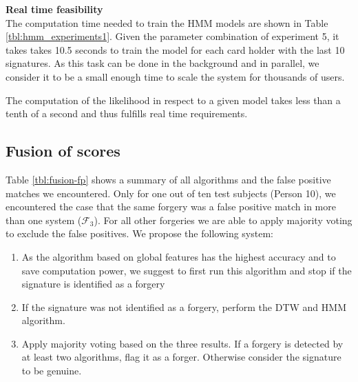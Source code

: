 \documentclass[a4paper, oneside]{csthesis}
\begin{document}
\textbf{Real time feasibility}\\
The computation time needed to train the HMM models are shown in Table \ref{tbl:hmm_experiments1}. Given the parameter combination of experiment 5, it takes takes 10.5 seconds to train the model for each card holder with the last 10 signatures. As this task can be done in the background and in parallel, we consider it to be a small enough time to scale the system for thousands of users.

The computation of the likelihood in respect to a given model takes less than a tenth of a second and thus fulfills real time requirements.


\newpage
\subsection{Fusion of scores}

Table \ref{tbl:fusion-fp} shows a summary of all algorithms and the false positive matches we encountered. Only for one out of ten test subjects (Person 10), we encountered the case that the same forgery was a false positive match in more than one system ($\mathcal{F}_3$). For all other forgeries we are able to apply majority voting to exclude the false positives. We propose the following system:

\begin{enumerate}
\item As the algorithm based on global features has the highest accuracy and to save computation power, we suggest to first run this algorithm and stop if the signature is identified as a forgery
\item If the signature was not identified as a forgery, perform the DTW and HMM algorithm.
\item Apply majority voting based on the three results. If a forgery is detected by at least two algorithms, flag it as a forger. Otherwise consider the signature to be genuine.
\end{enumerate}
\end{document}
